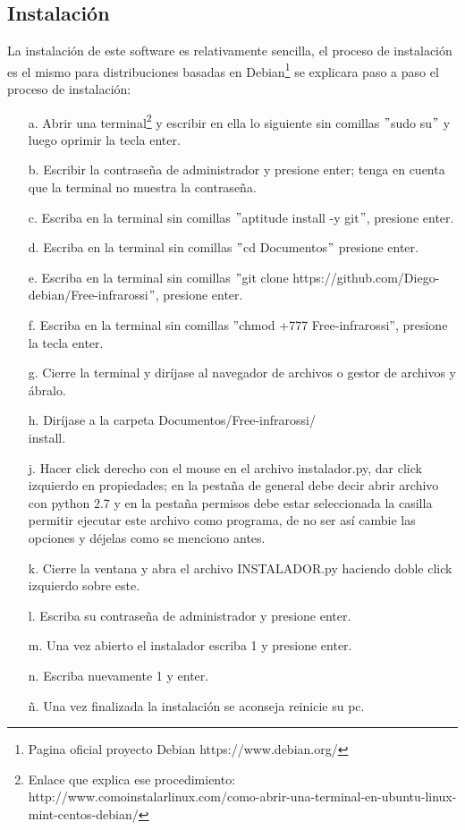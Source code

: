 \documentclass[12]{article}
\begin{document}
\begin{multicols}{2}
\subsection{Instalación}
La instalación de este software es relativamente sencilla, el proceso de instalación es el mismo para distribuciones basadas en Debian\footnote{Pagina oficial proyecto Debian https://www.debian.org/} se  explicara paso a paso el proceso de instalación:
\begin{enumerate}
\item[a.] Abrir una terminal\footnote{Enlace que explica ese procedimiento: http://www.comoinstalarlinux.com/como-abrir-una-terminal-en-ubuntu-linux-mint-centos-debian/} y escribir en ella lo siguiente sin comillas $"$sudo su$"$ y luego oprimir la tecla enter.
\item[b.] Escribir la contraseña de administrador y presione enter; tenga en cuenta que la terminal no muestra la contraseña.
\item[c.] Escriba en la terminal sin comillas $"$aptitude install -y git$"$, presione enter.
\item[d.] Escriba en la terminal sin comillas $"$cd Documentos$"$ presione enter.
\item[e.] Escriba en la terminal sin comillas $"$git clone https://github.com/Diego-debian/Free-infrarossi$"$, presione enter.
\item[f.] Escriba en la terminal sin comillas $”$chmod +777 Free-infrarossi$”$, presione la tecla enter.
\item[g.] Cierre la terminal y diríjase al navegador de archivos o gestor de archivos y ábralo.
\item[h.] Diríjase a la carpeta Documentos/Free-infrarossi/\\install.
\item[j.] Hacer click derecho con el mouse en el archivo instalador.py,  dar click izquierdo en propiedades; en la pestaña de general debe decir abrir archivo con python 2.7 y en la pestaña permisos debe estar seleccionada la casilla permitir ejecutar este archivo como programa, de no ser así cambie las opciones y déjelas como se menciono antes.
\item[k.] Cierre la ventana y abra el archivo INSTALADOR.py haciendo doble click izquierdo sobre este.
\item[l.] Escriba su contraseña de administrador y presione enter.
\item[m.] Una vez abierto el instalador escriba  1 y presione enter.
\item[n.] Escriba nuevamente 1 y enter.
\item[ñ.] Una vez finalizada la instalación se aconseja reinicie su pc.
\end{enumerate}

\end{multicols}
\end{document}
